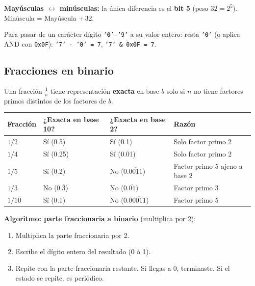 \documentclass[12pt, oneside]{article}
\begin{document}
\textbf{Mayúsculas $\leftrightarrow$ minúsculas:} la única diferencia es el
\textbf{bit 5} (peso $32 = 2^5$).
Minúscula = Mayúscula $+\, 32$.

\begin{consejo}
  Para pasar de un carácter dígito \texttt{'0'–'9'} a su valor entero: resta
  \texttt{'0'} (o aplica AND con \texttt{0x0F}):
  \texttt{'7' - '0' = 7}, \quad \texttt{'7' \& 0x0F = 7}.
\end{consejo}

\subsection{Fracciones en binario}

Una fracción $\frac{1}{n}$ tiene representación \textbf{exacta} en base $b$
solo si $n$ no tiene factores primos distintos de los factores de $b$.

\begin{center}
\begin{tabular}{llll}
  \toprule
  \textbf{Fracción} & \textbf{¿Exacta en base 10?} & \textbf{¿Exacta en base 2?} & \textbf{Razón} \\
  \midrule
  $1/2$  & Sí (0.5)            & Sí (0.1)           & Solo factor primo 2 \\
  $1/4$  & Sí (0.25)           & Sí (0.01)          & Solo factor primo 2 \\
  $1/5$  & Sí (0.2)            & No ($0.\overline{0011}$) & Factor primo 5 ajeno a base 2 \\
  $1/3$  & No ($0.\overline{3}$) & No ($0.\overline{01}$) & Factor primo 3 \\
  $1/10$ & Sí (0.1)            & No ($0.0\overline{0011}$) & Factor primo 5 \\
  \bottomrule
\end{tabular}
\end{center}

\textbf{Algoritmo: parte fraccionaria a binario} (multiplica por 2):
\begin{enumerate}
  \item Multiplica la parte fraccionaria por 2.
  \item Escribe el dígito entero del resultado (0 ó 1).
  \item Repite con la parte fraccionaria restante.
        Si llegas a 0, terminaste. Si el estado se repite, es periódico.
\end{enumerate}
\end{document}
